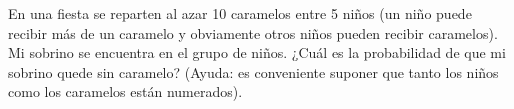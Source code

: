 \item En una fiesta se reparten al azar 10 caramelos entre 5 niños (un niño puede recibir más de un caramelo y obviamente otros niños pueden recibir caramelos). Mi sobrino se encuentra en el grupo de niños. ¿Cuál es la probabilidad de que mi sobrino quede sin caramelo? (Ayuda: es conveniente suponer que tanto los niños como los caramelos están numerados).
